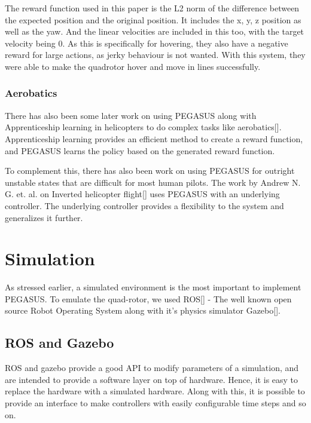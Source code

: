 \documentclass[BTech]{iitmdiss}
\begin{document}
The reward function used in this paper is the L2 norm of the difference between the expected position and the original position. It includes the x, y, z position as well as the yaw. And the linear velocities are included in this too, with the target velocity being 0. As this is specifically for hovering, they also have a negative reward for large actions, as jerky behaviour is not wanted. With this system, they were able to make the quadrotor hover and move in lines successfully.

\subsection{Aerobatics}

There has also been some later work on using PEGASUS along with Apprenticeship learning in helicopters to do complex tasks like aerobatics[]. Apprenticeship learning provides an efficient method to create a reward function, and PEGASUS learns the policy based on the generated reward function.

To complement this, there has also been work on using PEGASUS for outright unstable states that are difficult for most human pilots. The work by Andrew N. G. et. al. on Inverted helicopter flight[\cite{InvertedHelicopterFlight}] uses PEGASUS with an underlying controller. The underlying controller provides a flexibility to the system and generalizes it further.


\chapter{Simulation}

As stressed earlier, a simulated environment is the most important to implement PEGASUS. To emulate the quad-rotor, we used ROS[] - The well known open source Robot Operating System along with it's physics simulator Gazebo[\cite{Gazebo}].

\section{ROS and Gazebo}

ROS and gazebo provide a good API to modify parameters of a simulation, and are intended to provide a software layer on top of hardware. Hence, it is easy to replace the hardware with a simulated hardware. Along with this, it is possible to provide an interface to make controllers with easily configurable time steps and so on.
\end{document}

